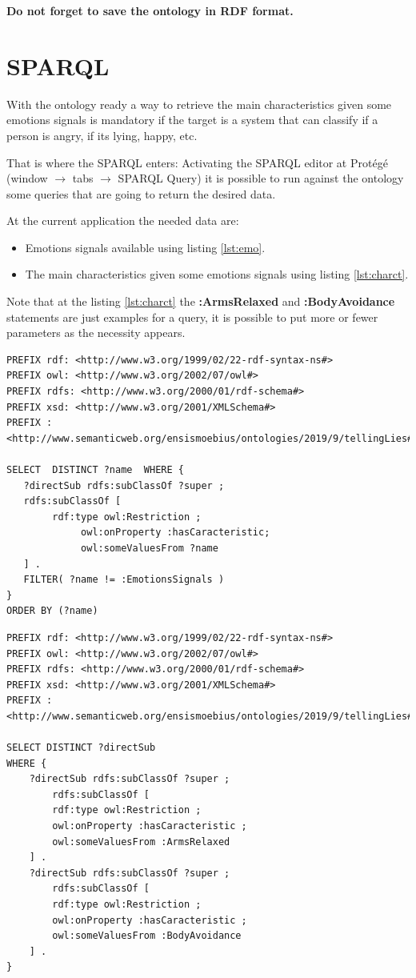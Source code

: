 \documentclass[conference]{IEEEtran}
\begin{document}
\textbf{Do not forget to save the ontology in RDF format.}

\section{SPARQL}
With the ontology ready a way to retrieve the main characteristics given some emotions signals is mandatory if the target is a system that can classify if a person is angry, if its lying, happy, etc.

That is where the SPARQL enters: Activating the SPARQL editor at Protégé (window $\rightarrow$ tabs $\rightarrow$ SPARQL Query) it is possible to run against the ontology some queries that are going to return the desired data.

At the current application the needed data are:
\begin{itemize}
	\item Emotions signals available using listing \ref{lst:emo}.
	\item The main characteristics given some emotions signals using listing \ref{lst:charct}.
\end{itemize}

Note that at the listing \ref{lst:charct} the \textbf{:ArmsRelaxed} and \textbf{:BodyAvoidance} statements are just examples for a query, it is possible to put more or fewer parameters as the necessity appears.
\begin{lstlisting}[language=SPARQL, caption={Getting Emotions signals available}, label={lst:emo}]
PREFIX rdf: <http://www.w3.org/1999/02/22-rdf-syntax-ns#>
PREFIX owl: <http://www.w3.org/2002/07/owl#>
PREFIX rdfs: <http://www.w3.org/2000/01/rdf-schema#>
PREFIX xsd: <http://www.w3.org/2001/XMLSchema#>
PREFIX : <http://www.semanticweb.org/ensismoebius/ontologies/2019/9/tellingLies#>

SELECT  DISTINCT ?name  WHERE { 
   ?directSub rdfs:subClassOf ?super ;
   rdfs:subClassOf [ 
        rdf:type owl:Restriction ;
             owl:onProperty :hasCaracteristic;
             owl:someValuesFrom ?name
   ] .
   FILTER( ?name != :EmotionsSignals )
}
ORDER BY (?name)
\end{lstlisting}

\begin{lstlisting}[language=SPARQL, caption={Getting the main characteristics given some emotions signals}, label={lst:charct}]
PREFIX rdf: <http://www.w3.org/1999/02/22-rdf-syntax-ns#>
PREFIX owl: <http://www.w3.org/2002/07/owl#>
PREFIX rdfs: <http://www.w3.org/2000/01/rdf-schema#>
PREFIX xsd: <http://www.w3.org/2001/XMLSchema#>
PREFIX : <http://www.semanticweb.org/ensismoebius/ontologies/2019/9/tellingLies#>

SELECT DISTINCT ?directSub 
WHERE { 
	?directSub rdfs:subClassOf ?super ;
		rdfs:subClassOf [ 
		rdf:type owl:Restriction ;
		owl:onProperty :hasCaracteristic ;
		owl:someValuesFrom :ArmsRelaxed
	] .
	?directSub rdfs:subClassOf ?super ;
		rdfs:subClassOf [ 
		rdf:type owl:Restriction ;
		owl:onProperty :hasCaracteristic ;
		owl:someValuesFrom :BodyAvoidance
	] .
}
\end{lstlisting}
\end{document}
